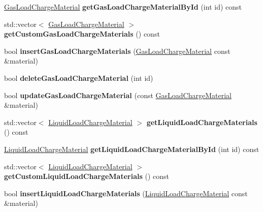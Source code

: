 \begin{DoxyCompactItemize}
\hyperlink{class_gas_load_charge_material}{Gas\+Load\+Charge\+Material} {\bfseries get\+Gas\+Load\+Charge\+Material\+By\+Id} (int id) const
\item 
\mbox{\label{class_s_q_lite_a2491f6b082059bde751dfd117f1feed6}} 
std\+::vector$<$ \hyperlink{class_gas_load_charge_material}{Gas\+Load\+Charge\+Material} $>$ {\bfseries get\+Custom\+Gas\+Load\+Charge\+Materials} () const
\item 
\mbox{\label{class_s_q_lite_af482f51c0d3de08fbfa3e537382a567f}} 
bool {\bfseries insert\+Gas\+Load\+Charge\+Materials} (\hyperlink{class_gas_load_charge_material}{Gas\+Load\+Charge\+Material} const \&material)
\item 
\mbox{\label{class_s_q_lite_a3717a443c1151d717168d323ec6576c1}} 
bool {\bfseries delete\+Gas\+Load\+Charge\+Material} (int id)
\item 
\mbox{\label{class_s_q_lite_a21b8fbcd52ac37fe9e78df164ee8de25}} 
bool {\bfseries update\+Gas\+Load\+Charge\+Material} (const \hyperlink{class_gas_load_charge_material}{Gas\+Load\+Charge\+Material} \&material)
\item 
\mbox{\label{class_s_q_lite_a375614ae9d9748646cba88c834796272}} 
std\+::vector$<$ \hyperlink{class_liquid_load_charge_material}{Liquid\+Load\+Charge\+Material} $>$ {\bfseries get\+Liquid\+Load\+Charge\+Materials} () const
\item 
\mbox{\label{class_s_q_lite_a3f31756b0fc49be7123e7146cbb12c70}} 
\hyperlink{class_liquid_load_charge_material}{Liquid\+Load\+Charge\+Material} {\bfseries get\+Liquid\+Load\+Charge\+Material\+By\+Id} (int id) const
\item 
\mbox{\label{class_s_q_lite_aaebe47614c69a50c86a5f585e7b8305c}} 
std\+::vector$<$ \hyperlink{class_liquid_load_charge_material}{Liquid\+Load\+Charge\+Material} $>$ {\bfseries get\+Custom\+Liquid\+Load\+Charge\+Materials} () const
\item 
\mbox{\label{class_s_q_lite_aff9ccdb8af003d3a0a3fdc9a85af77d8}} 
bool {\bfseries insert\+Liquid\+Load\+Charge\+Materials} (\hyperlink{class_liquid_load_charge_material}{Liquid\+Load\+Charge\+Material} const \&material)

\end{DoxyCompactItemize}

